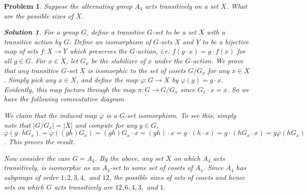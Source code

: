 \documentclass[11pt]{article}
\newcommand{\1}{\textbf{1}}
\newtheorem{prob}{Problem}
\newtheorem*{sol*}{\textit{Solution}}
\begin{document}
\begin{prob}
Suppose the alternating group $A_4$ acts transitively on a set $X$. What are the possible sizes of $X$. 

\begin{sol*}

\textnormal{ For a group $G$, define a transitive $G$-set to be a set $X$ with a transitive action by $G$. Define an isomorphism of $G$-sets $X$ and $Y$ to be a bijective map of sets $f:X\rightarrow Y$ which preserves the $G$-action, i.e. $f(g\cdot x) = g \cdot f(x)$ for all $g\in G$. For $x\in X$, let $G_x$ be the stabilizer of $x$ under the $G$-action. We prove that any transitive $G$-set $X$ is isomorphic to the set of cosets $G/G_x$ for any $x\in X$. Simply pick any $x\in X$, and define the map $\varphi:G\rightarrow X$ by $\varphi(g) = g\cdot x$. Evidently, this map factors through the map $\pi :G\rightarrow G/G_x$ since $G_x\cdot x = x$. So we have the following commutative diagram
}

\begin{center}
\end{center}
\textnormal{ We claim that the induced map $\overline{\varphi}$ is a $G$-set isomorphism. To see this, simply note that $|G/G_x| = |X|$ and compute for any $g\in G$, $\overline{\varphi}(g\cdot hG_x) = \overline{\varphi}((gh)G_x) = (gh)G_x\cdot x = (gh)\cdot x = g\cdot(h\cdot x) = g\cdot(hG_x\cdot x) = g\overline{\varphi}(hG_x)$. This proves the result.
}

\textnormal{Now consider the case $G= A_4$. By the above, any set $X$ on which $A_4$ acts transitively, is isomorphic as an $A_4$-set to some set of cosets of $A_4$. Since $A_4$ has subgroups of order $1, 2, 3, 4,$ and $12$, the possible sizes of sets of cosets and hence sets on which $G$ acts transitively are $12, 6, 4, 3,$ and $1$. 
}

\end{sol*}
\end{prob}
\end{document}
